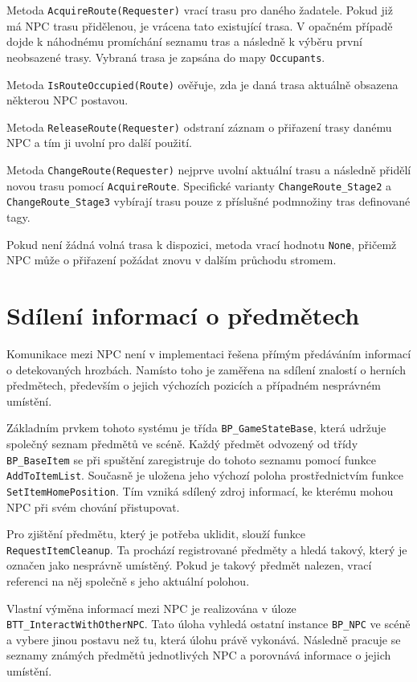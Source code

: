 Metoda \texttt{AcquireRoute(Requester)} vrací trasu pro daného žadatele. 
Pokud již má NPC trasu přidělenou, je vrácena tato existující trasa. 
V opačném případě dojde k náhodnému promíchání seznamu tras a následně k výběru první neobsazené trasy.
Vybraná trasa je zapsána do mapy \texttt{Occupants}.

Metoda \texttt{IsRouteOccupied(Route)} ověřuje, zda je daná trasa aktuálně obsazena některou NPC postavou.

Metoda \texttt{ReleaseRoute(Requester)} odstraní záznam o přiřazení trasy danému NPC a tím ji uvolní pro další použití.

Metoda \texttt{ChangeRoute(Requester)} nejprve uvolní aktuální trasu a následně přidělí novou trasu pomocí \texttt{AcquireRoute}.
Specifické varianty \texttt{ChangeRoute\_Stage2} a \texttt{ChangeRoute\_Stage3} vybírají trasu pouze z příslušné podmnožiny tras definované tagy.

Pokud není žádná volná trasa k dispozici, metoda vrací hodnotu \texttt{None}, přičemž NPC může o přiřazení požádat znovu v dalším průchodu stromem.

\section{Sdílení informací o předmětech}
\label{sec:sharing_information}

Komunikace mezi NPC není v implementaci řešena přímým předáváním informací o detekovaných hrozbách. 
Namísto toho je zaměřena na sdílení znalostí o herních předmětech, především o jejich výchozích pozicích a případném nesprávném umístění.

Základním prvkem tohoto systému je třída \texttt{BP\_GameStateBase}, která udržuje společný seznam předmětů ve scéně. Každý předmět odvozený
od třídy \texttt{BP\_BaseItem} se při spuštění zaregistruje do tohoto seznamu pomocí funkce \texttt{AddToItemList}. 
Současně je uložena jeho výchozí poloha prostřednictvím funkce \texttt{SetItemHomePosition}.
Tím vzniká sdílený zdroj informací, ke kterému mohou NPC při svém chování přistupovat.

Pro zjištění předmětu, který je potřeba uklidit, slouží funkce \texttt{RequestItemCleanup}. 
Ta prochází registrované předměty a hledá takový, který je označen jako nesprávně umístěný. 
Pokud je takový předmět nalezen, vrací referenci na něj společně s jeho aktuální polohou.

Vlastní výměna informací mezi NPC je realizována v úloze \texttt{BTT\_InteractWithOtherNPC}. 
Tato úloha vyhledá ostatní instance \texttt{BP\_NPC} ve scéně a vybere jinou postavu než tu, která úlohu právě vykonává. 
Následně pracuje se seznamy známých předmětů jednotlivých NPC a porovnává informace o jejich umístění.

